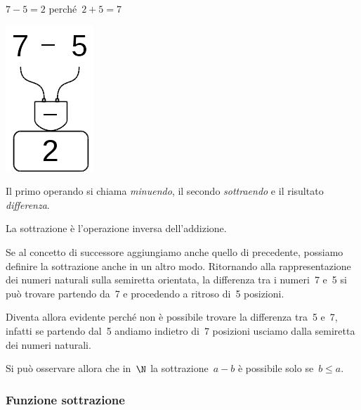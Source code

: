 \begin{minipage}{0.80\textwidth}
 \centering
 \(7-5=2\) perché~\(2+5=7\)

 
\end{minipage}%
\begin{minipage}{0.15\textwidth}
 \centering
\begin{inaccessibleblock}
 \includegraphics[scale=0.35]{img/op_sot.png}
\end{inaccessibleblock}
\end{minipage}%

Il primo operando si chiama \emph{minuendo}, il secondo \emph{sottraendo} e 
il risultato \emph{differenza}.

La sottrazione è l'operazione inversa dell'addizione.

Se al concetto di successore aggiungiamo anche quello di precedente, 
possiamo definire la sottrazione anche in un altro modo.
Ritornando alla rappresentazione dei numeri naturali sulla semiretta 
orientata, la differenza tra i numeri~7 e~5 si può trovare partendo da~7 e 
procedendo a ritroso di~5 posizioni.

Diventa allora evidente perché non è possibile trovare la differenza 
tra~5 e~7, infatti se partendo dal~5 andiamo indietro di~7 posizioni 
usciamo dalla semiretta dei numeri naturali.

\begin{inaccessibleblock}

\end{inaccessibleblock}

Si può osservare allora che in~\(\N\) la sottrazione~\(a - b\) è possibile 
solo se~\(b\leq a\).

\subsubsection{Funzione sottrazione}

